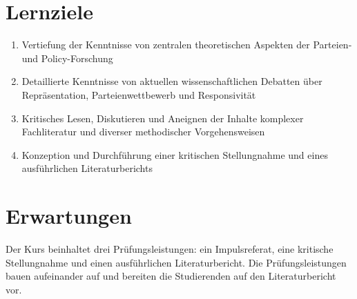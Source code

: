 \documentclass[abstract=on,parskip=full,headings=standardclasses,fontsize=11pt,paper=a4]{scrartcl}
\begin{document}
\section*{Lernziele}

\begin{enumerate}
\item Vertiefung der Kenntnisse von zentralen theoretischen Aspekten der Parteien- und Policy-Forschung
\item Detaillierte Kenntnisse von aktuellen wissenschaftlichen Debatten über Repräsentation, Parteienwettbewerb und Responsivität
\item  Kritisches Lesen, Diskutieren und Aneignen der Inhalte komplexer Fachliteratur und diverser methodischer Vorgehensweisen
\item Konzeption und Durchführung einer kritischen Stellungnahme und eines ausführlichen Literaturberichts
\end{enumerate}

\section*{Erwartungen}

Der Kurs beinhaltet drei Prüfungsleistungen: ein Impulsreferat, eine kritische Stellungnahme und einen ausführlichen Literaturbericht. Die  Prüfungsleistungen bauen aufeinander auf und bereiten die Studierenden auf den Literaturbericht vor. 
\end{document}
